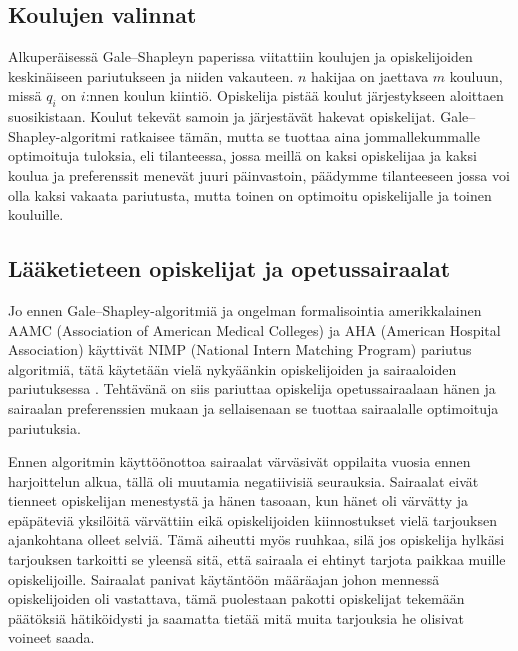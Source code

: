 \documentclass[finnish]{tktltiki2}
\theoremstyle{definition}
\theoremstyle{remark}
\begin{document}
\subsection{Koulujen valinnat}
Alkuperäisessä Gale--Shapleyn paperissa \cite{gale62a} viitattiin koulujen ja opiskelijoiden keskinäiseen pariutukseen ja niiden vakauteen. $n$ hakijaa on jaettava $m$ kouluun, missä $q_{i}$ on $i$:nnen koulun kiintiö. Opiskelija pistää koulut järjestykseen aloittaen suosikistaan. Koulut tekevät samoin ja järjestävät hakevat opiskelijat. Gale--Shapley-algoritmi ratkaisee tämän, mutta se tuottaa aina jommallekummalle optimoituja tuloksia, eli tilanteessa, jossa meillä on kaksi opiskelijaa ja kaksi koulua ja preferenssit menevät juuri päinvastoin, päädymme tilanteeseen jossa voi olla kaksi vakaata pariutusta, mutta toinen on optimoitu opiskelijalle ja toinen kouluille.

\subsection{Lääketieteen opiskelijat ja opetussairaalat}
Jo ennen Gale--Shapley-algoritmiä ja ongelman formalisointia amerikkalainen AAMC (Association of American Medical Colleges) ja AHA (American Hospital Association) käyttivät NIMP (National Intern Matching Program) pariutus algoritmiä, tätä käytetään vielä nykyäänkin opiskelijoiden ja sairaaloiden pariutuksessa \cite{roth84}. Tehtävänä on siis pariuttaa opiskelija opetussairaalaan hänen ja sairaalan preferenssien mukaan ja sellaisenaan se tuottaa sairaalalle optimoituja pariutuksia.

Ennen algoritmin käyttöönottoa sairaalat värväsivät oppilaita vuosia ennen harjoittelun alkua, tällä oli muutamia negatiivisiä seurauksia. Sairaalat eivät tienneet opiskelijan menestystä ja hänen tasoaan, kun hänet oli värvätty ja epäpäteviä yksilöitä värvättiin eikä opiskelijoiden kiinnostukset vielä tarjouksen ajankohtana olleet selviä. Tämä aiheutti myös ruuhkaa, silä jos opiskelija hylkäsi tarjouksen tarkoitti se yleensä sitä, että sairaala ei ehtinyt tarjota paikkaa muille opiskelijoille. Sairaalat panivat käytäntöön määräajan johon mennessä opiskelijoiden oli vastattava, tämä puolestaan pakotti opiskelijat tekemään päätöksiä hätiköidysti ja saamatta tietää mitä muita tarjouksia he olisivat voineet saada.



%
%
% 
%



\end{document}
